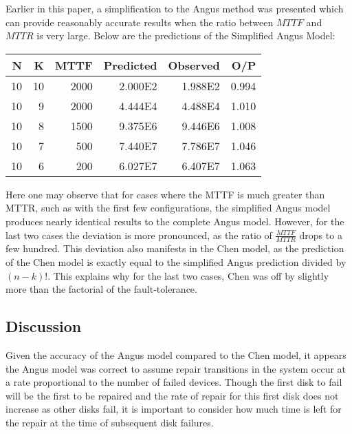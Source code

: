 \documentclass[XXX,endnotes]{usetex-v1}
\begin{document}
Earlier in this paper, a simplification to the Angus method was presented which can provide reasonably accurate results when the ratio between $MTTF$ and $MTTR$ is very large.  Below are the predictions of the Simplified Angus Model:

\begin{center}
  \begin{tabular}{ | r | r | r | r | r | r | }
    \hline
      N       & K        & MTTF     & Predicted    & Observed  & O/P         \\ \hline
      10      & 10       & 2000     & 2.000E2      & 1.988E2   & 0.994       \\ \hline
      10      & 9        & 2000     & 4.444E4      & 4.488E4   & 1.010       \\ \hline
      10      & 8        & 1500     & 9.375E6      & 9.446E6   & 1.008       \\ \hline
      10      & 7        & 500      & 7.440E7      & 7.786E7   & 1.046       \\ \hline
      10      & 6        & 200      & 6.027E7      & 6.407E7   & 1.063       \\ \hline
  \end{tabular}
\end{center}

Here one may observe that for cases where the MTTF is much greater than MTTR, such as with the first few configurations, the simplified Angus model produces nearly identical results to the complete Angus model.  However, for the last two cases the deviation is more pronounced, as the ratio of $\frac{MTTF}{MTTR}$ drops to a few hundred.  This deviation also manifests in the Chen model, as the prediction of the Chen model is exactly equal to the simplified Angus prediction divided by $(n - k)!$.  This explains why for the last two cases, Chen was off by slightly more than the factorial of the fault-tolerance.

\subsection{Discussion}

Given the accuracy of the Angus model compared to the Chen model, it appears the Angus model was correct to assume repair transitions in the system occur at a rate proportional to the number of failed devices.  Though the first disk to fail will be the first to be repaired and the rate of repair for this first disk does not increase as other disks fail, it is important to consider how much time is left for the repair at the time of subsequent disk failures.
\end{document}
